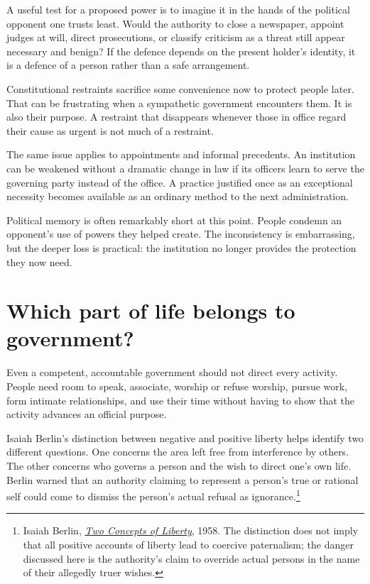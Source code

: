 \documentclass[12pt,a4paper]{book}
\begin{document}
A useful test for a proposed power is to imagine it in the hands of the political opponent one trusts least. Would the authority to close a newspaper, appoint judges at will, direct prosecutions, or classify criticism as a threat still appear necessary and benign? If the defence depends on the present holder's identity, it is a defence of a person rather than a safe arrangement.

Constitutional restraints sacrifice some convenience now to protect people later. That can be frustrating when a sympathetic government encounters them. It is also their purpose. A restraint that disappears whenever those in office regard their cause as urgent is not much of a restraint.

The same issue applies to appointments and informal precedents. An institution can be weakened without a dramatic change in law if its officers learn to serve the governing party instead of the office. A practice justified once as an exceptional necessity becomes available as an ordinary method to the next administration.

Political memory is often remarkably short at this point. People condemn an opponent's use of powers they helped create. The inconsistency is embarrassing, but the deeper loss is practical: the institution no longer provides the protection they now need.

\section*{Which part of life belongs to government?}

Even a competent, accountable government should not direct every activity. People need room to speak, associate, worship or refuse worship, pursue work, form intimate relationships, and use their time without having to show that the activity advances an official purpose.

Isaiah Berlin's distinction between negative and positive liberty helps identify two different questions. One concerns the area left free from interference by others. The other concerns who governs a person and the wish to direct one's own life. Berlin warned that an authority claiming to represent a person's true or rational self could come to dismiss the person's actual refusal as ignorance.\footnote{Isaiah Berlin, \href{https://berlin.wolf.ox.ac.uk/published_works/tcl/tcl-e.pdf}{\emph{Two Concepts of Liberty}}, 1958. The distinction does not imply that all positive accounts of liberty lead to coercive paternalism; the danger discussed here is the authority's claim to override actual persons in the name of their allegedly truer wishes.}
\end{document}

